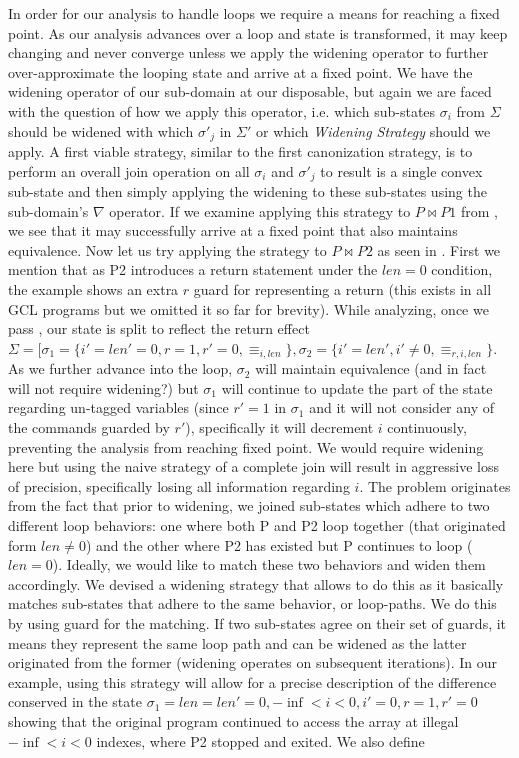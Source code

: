 In order for our analysis to handle loops we require a means for reaching a fixed point. As our analysis advances over a loop and state is transformed, it may keep changing and never converge unless we apply the widening operator to further over-approximate the looping state and arrive at a fixed point. We have the widening operator of our sub-domain at our disposable, but again we are faced with the question of how we apply this operator, i.e. which sub-states $\sigma_i$ from $\Sigma$ should be widened with which $\sigma'_j$ in $\Sigma'$ or which \emph{Widening Strategy} should we apply. A first viable strategy, similar to the first canonization strategy, is to perform an overall join operation on all $\sigma_i$ and $\sigma'_j$ to result is a single convex sub-state and then simply applying the widening to these sub-states using the sub-domain's $\nabla$ operator. If we examine applying this strategy to $P \bowtie P1$ from , we see that it may successfully arrive at a fixed point that also maintains equivalence. Now let us try applying the strategy to $P \bowtie P2$ as seen in . First we mention that as P2 introduces a return statement under the $len=0$ condition, the example shows an extra $r$ guard for representing a return (this exists in all GCL programs but we omitted it so far for brevity). While analyzing, once we pass , our state is split to reflect the return effect $\Sigma = [\sigma_1 = \{i' = len' = 0, r = 1, r' = 0, \equiv_{i,len}\},\sigma_2 = \{i' = len', i' \neq 0, \equiv_{r,i,len}\}$. As we further advance into the loop, $\sigma_2$ will maintain equivalence (and in fact will not require widening?) but $\sigma_1$ will continue to update the part of the state regarding un-tagged variables  (since $r'=1$ in $\sigma_1$ and it will not consider any of the commands guarded by $r'$), specifically it will decrement $i$ continuously, preventing the analysis from reaching fixed point. We would require widening here but using the naive strategy of a complete join will result in aggressive loss of precision, specifically losing all information regarding $i$. The problem originates from the fact that prior to widening, we joined sub-states which adhere to two different loop behaviors: one where both P and P2 loop together (that originated form $len \neq 0$) and the other where P2 has existed but P continues to loop ($len = 0$). Ideally, we would like to match these two behaviors and widen them accordingly. We devised a widening strategy that allows to do this as it basically matches sub-states that adhere to the same behavior, or loop-paths. We do this by using guard for the matching. If two sub-states agree on their set of guards, it means they represent the same loop path and can be widened as the latter originated from the former (widening operates on subsequent iterations). In our example, using this strategy will allow for a precise description of the difference conserved in the state $\sigma_1 = {len = len' =0, -\inf < i < 0, i' = 0, r = 1, r' = 0}$ showing that the original program continued to access the array at illegal $-\inf < i < 0$ indexes, where P2 stopped and exited. We also define 